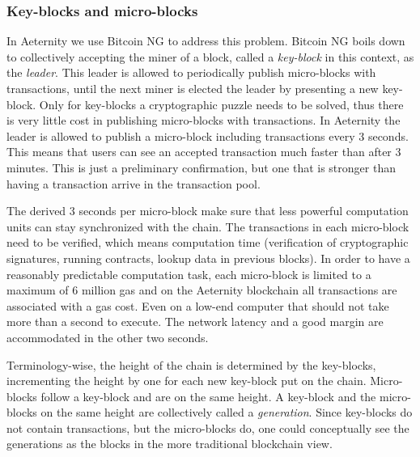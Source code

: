 \subsubsection{Key-blocks and micro-blocks}

In Aeternity we use Bitcoin NG \cite{Eyal:2016:BSB:2930611.2930615} to
address this problem. Bitcoin NG boils down to collectively accepting the miner of a
block, called a \textit{key-block} in this context, as the
\textit{leader}. This leader is allowed to periodically publish micro-blocks with
transactions, until the next miner is elected the leader by presenting a
new key-block. Only for key-blocks a cryptographic puzzle needs to be
solved, thus there is very little cost in publishing micro-blocks with
transactions. In Aeternity the leader is allowed to publish a
micro-block including transactions every 3 seconds. This means that
users can see an accepted transaction much faster than after 3
minutes. This is just a preliminary confirmation, but one that is
stronger than having a transaction arrive in the transaction pool.

The derived 3 seconds per micro-block make sure that less powerful
computation units can stay synchronized with the chain. The
transactions in each micro-block need to be verified, which means
computation time (verification of cryptographic signatures, running
contracts, lookup data in previous blocks). In order to have a
reasonably predictable computation task, each micro-block is limited to
a maximum of 6 million gas and on the Aeternity blockchain all
transactions are associated with a gas cost. Even on a low-end computer that should
not take more than a second to execute. The network latency and a good margin
are accommodated in the other two seconds.

Terminology-wise, the height of the chain is determined by the
key-blocks, incrementing the height by one for each new key-block put
on the chain. Micro-blocks follow a key-block and are on the same
height. A key-block and the micro-blocks on the same height are
collectively called a \textit{generation}. Since key-blocks do not contain
transactions, but the micro-blocks do, one could conceptually see the
generations as the blocks in the more traditional blockchain view.

